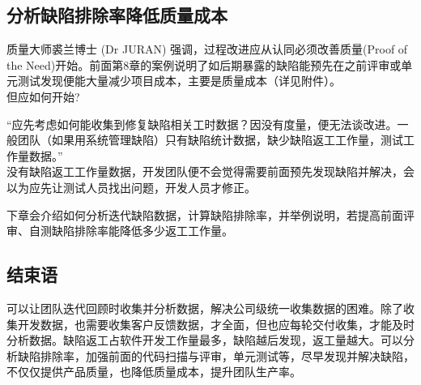 
\hypertarget{ux5206ux6790ux7f3aux9677ux6392ux9664ux7387ux964dux4f4eux8d28ux91cfux6210ux672c}{%
\subsection{分析缺陷排除率降低质量成本}\label{ux5206ux6790ux7f3aux9677ux6392ux9664ux7387ux964dux4f4eux8d28ux91cfux6210ux672c}}

质量大师裘兰博士 (Dr JURAN) 强调，过程改进应从认同必须改善质量(Proof of the Need)开始。前面第8章的案例说明了如后期暴露的缺陷能预先在之前评审或单元测试发现便能大量减少项目成本，主要是质量成本（详见附件）。\\



但应如何开始? 

“应先考虑如何能收集到修复缺陷相关工时数据？因没有度量，便无法谈改进。一般团队（如果用系统管理缺陷）只有缺陷统计数据，缺少缺陷返工工作量，测试工作量数据。”\\

没有缺陷返工工作量数据，开发团队便不会觉得需要前面预先发现缺陷并解决，会以为应先让测试人员找出问题，开发人员才修正。

下章会介绍如何分析迭代缺陷数据，计算缺陷排除率，并举例说明，若提高前面评审、自测缺陷排除率能降低多少返工工作量。


\hypertarget{ux7ed3ux675fux8bed}{%
\subsection{结束语}\label{ux7ed3ux675fux8bed}}

可以让团队迭代回顾时收集并分析数据，解决公司级统一收集数据的困难。除了收集开发数据，也需要收集客户反馈数据，才全面，但也应每轮交付收集，才能及时分析数据。缺陷返工占软件开发工作量最多，缺陷越后发现，返工量越大。可以分析缺陷排除率，加强前面的代码扫描与评审，单元测试等，尽早发现并解决缺陷，不仅仅提供产品质量，也降低质量成本，提升团队生产率。

